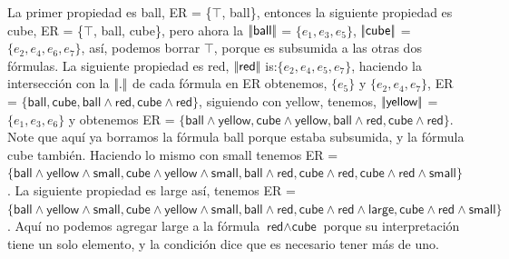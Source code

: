 La primer propiedad es \textsf{ball}, ER = \{$\top$, \textsf{ball}\}, entonces la siguiente propiedad es \textsf{cube}, ER = \{$\top$, \textsf{ball}, \textsf{cube}\}, pero ahora la $|\!|\textsf{ball}|\!|$ = $\{e_1, e_3, e_5\}$, $|\!|\textsf{cube}|\!|$ = $\{e_2, e_4, e_6, e_7\}$, as\'i, podemos borrar $\top$, porque es subsumida a las otras dos f\'ormulas. La siguiente propiedad es  \textsf{red}, $|\!|\textsf{red}|\!|$ is:$\{e_2, e_4, e_5, e_7\}$, haciendo la intersecci\'on con la $|\!|.|\!|$ de cada f\'ormula en ER obtenemos, $\{e_5\}$ y $\{e_2, e_4, e_7\}$, ER = $\{\textsf{ball}, \textsf{cube}, \textsf{ball} \wedge \textsf{red}, \textsf{cube} \wedge \textsf{red}\}$, siguiendo con \textsf{yellow}, tenemos, $|\!|\textsf{yellow}|\!|$ = $\{e_1, e_3, e_6\}$ y obtenemos ER = $\{\textsf{ball} \wedge \textsf{yellow}, \textsf{cube} \wedge \textsf{yellow}, \textsf{ball} \wedge \textsf{red}, \textsf{cube} \wedge \textsf{red}\}$. 
Note que aqu\'i ya borramos la f\'ormula \textsf{ball} porque estaba subsumida, y la f\'ormula \textsf{cube} tambi\'en.
Haciendo lo mismo con \textsf{small} tenemos ER = $\{\textsf{ball} \wedge \textsf{yellow} \wedge \textsf{small}, \textsf{cube} \wedge \textsf{yellow} \wedge \textsf{small}, \textsf{ball} \wedge \textsf{red}, \textsf{cube} \wedge \textsf{red}, \textsf{cube} \wedge \textsf{red} \wedge \textsf{small}\}$. La siguiente propiedad es \textsf{large} as\'i, tenemos ER = $\{\textsf{ball} \wedge \textsf{yellow} \wedge \textsf{small}, \textsf{cube} \wedge \textsf{yellow} \wedge \textsf{small}, \textsf{ball} \wedge \textsf{red}, \textsf{cube} \wedge \textsf{red} \wedge \textsf{large}, \textsf{cube} \wedge \textsf{red} \wedge \textsf{small}\}$. Aqu\'i no podemos agregar \textsf{large} a la f\'ormula $\textsf{red} \wedge \textsf{cube}$ porque su interpretaci\'on tiene un solo elemento, y la condici\'on dice que es necesario tener m\'as de uno.

